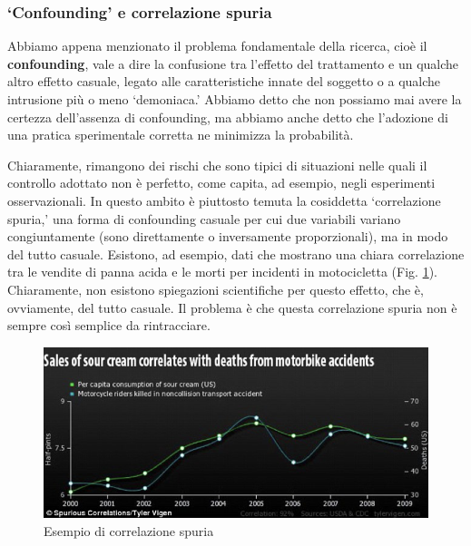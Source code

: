 \documentclass[a4paper,12pt,oneside]{book}
\begin{document}
\hypertarget{confounding-e-correlazione-spuria}{%
\subsubsection{`Confounding' e correlazione spuria}\label{confounding-e-correlazione-spuria}}

Abbiamo appena menzionato il problema fondamentale della ricerca, cioè il \textbf{confounding}, vale a dire la confusione tra l'effetto del trattamento e un qualche altro effetto casuale, legato alle caratteristiche innate del soggetto o a qualche intrusione più o meno `demoniaca.' Abbiamo detto che non possiamo mai avere la certezza dell'assenza di confounding, ma abbiamo anche detto che l'adozione di una pratica sperimentale corretta ne minimizza la probabilità.

Chiaramente, rimangono dei rischi che sono tipici di situazioni nelle quali il controllo adottato non è perfetto, come capita, ad esempio, negli esperimenti osservazionali. In questo ambito è piuttosto temuta la cosiddetta `correlazione spuria,' una forma di confounding casuale per cui due variabili variano congiuntamente (sono direttamente o inversamente proporzionali), ma in modo del tutto casuale. Esistono, ad esempio, dati che mostrano una chiara correlazione tra le vendite di panna acida e le morti per incidenti in motocicletta (Fig. \ref{fig:figName22}). Chiaramente, non esistono spiegazioni scientifiche per questo effetto, che è, ovviamente, del tutto casuale. Il problema è che questa correlazione spuria non è sempre così semplice da rintracciare.

\begin{figure}

{\centering \includegraphics[width=0.9\linewidth]{_images/PannaAcida} 

}

\caption{Esempio di correlazione spuria}\label{fig:figName22}
\end{figure}
\end{document}
